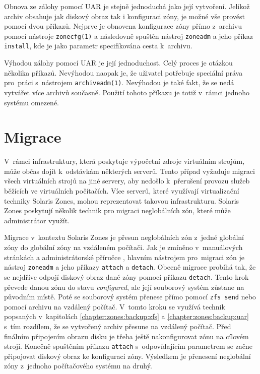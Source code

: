 Obnova ze zálohy pomocí UAR je stejně jednoduchá jako její vytvoření. Jelikož archiv obsahuje jak diskový obraz tak i konfiguraci
zóny, je možné vše provést pomocí dvou příkazů. Nejprve je obnovena konfigurace zóny přímo z~archivu pomocí nástroje \verb|zonecfg(1)|
a následovně spuštěn nástroj \verb|zoneadm| a jeho příkaz \verb|install|, kde je jako parametr specifikována cesta k~archivu.

Výhodou zálohy pomocí UAR je její jednoduchost. Celý proces je otázkou několika příkazů. Nevýhodou naopak je, že uživatel
potřebuje speciální práva pro~práci s~nástrojem \verb|archiveadm(1)|. Nevýhodou je také fakt, že se nedá vytvářet více archivů
současně. Použití tohoto příkazu je totiž v~rámci jednoho systému omezené.
\section{Migrace}
\label{chapter:zones:migration}
V~rámci infrastruktury, která poskytuje výpočetní zdroje virtuálním strojům, může občas dojít k~odstávkám některých serverů.
Tento případ vyžaduje migraci všech virtuálních strojů na jiné servery, aby nedošlo k~přerušení provozu služeb běžících ve 
virtuálních počítačích. Více serverů, které využívají virtualizační techniky Solaris Zones, mohou reprezentovat takovou infrastrukturu.
Solaris Zones poskytují několik technik pro migraci neglobálních zón, které může administrátor využít.

Migrace v~kontextu Solaris Zones je přesun neglobálních zón z~jedné globální zóny do globální zóny na vzdáleném počítači. Jak je
zmíněno v~manuálových stránkách \cite{oracle:manpages:zoneadm} a administrátorské příručce \cite{oracle:solaris:zones:migration},
hlavním nástrojem pro~migraci zón je nástroj \verb|zoneadm| a jeho příkazy \verb|attach| a \verb|detach|. Obecně migrace
probíhá tak, že se nejdříve odpojí diskový obraz dané zóny pomocí příkazu \verb|detach|. Tento krok převede danou zónu
do stavu \textit{configured}, ale její souborový systém zůstane na původním místě. Poté se souborový systém přenese přímo pomocí
\verb|zfs send| nebo pomocí archivu na vzdálený počítač. V~tomto kroku se využívá technik popsaných v~kapitolách 
\ref{chapter:zones:backup:zfs} a \ref{chapter:zones:backup:uar} s~tím rozdílem, že se vytvořený archiv přesune na vzdálený
počítač. Před finálním připojením obrazu disku je třeba ještě nakonfigurovat zónu na cílovém stroji. Konečně spuštěním
příkazu \verb|attach| s~odpovídajícím parametrem se začne připojovat diskový obraz ke konfiguraci zóny. Výsledkem je  přenesení
neglobální zóny z~jednoho počítačového systému na druhý.